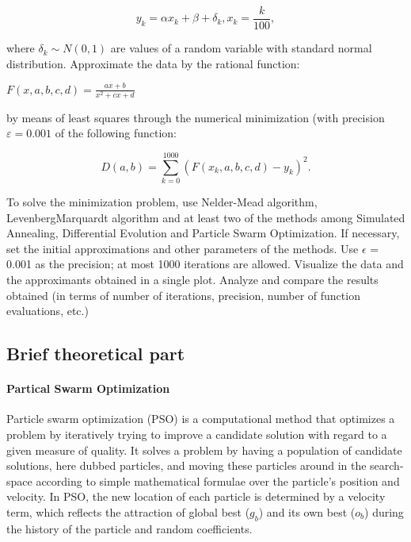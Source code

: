 \documentclass{article}
\begin{document}
\begin{equation}
    y_k = \alpha x_k + \beta + \delta_k, x_k = \frac{k}{100},
\end{equation}

where $\delta_k \sim N(0, 1)$ are values of a random variable with standard normal distribution.
Approximate the data by the rational function:

\begin{center}
    \item $F(x, a, b, c, d) = \frac{ax + b}{x^2 + cx + d}$
\end{center}

by means of least squares through the numerical minimization (with precision $\varepsilon = 0.001$ of the following function:

\begin{equation}
    D(a, b) = \sum^{1000}_{k=0}(F(x_k, a, b, c, d) - y_k)^2.
\end{equation}

To solve the minimization problem, use Nelder-Mead algorithm, LevenbergMarquardt algorithm and at least two of the methods among Simulated Annealing,
Differential Evolution and Particle Swarm Optimization. If necessary, set the initial
approximations and other parameters of the methods. Use $\epsilon$ = 0.001 as the
precision; at most 1000 iterations are allowed. Visualize the data and the
approximants obtained in a single plot. Analyze and compare the results obtained
(in terms of number of iterations, precision, number of function evaluations, etc.)
\subsection*{Brief theoretical part}

\paragraph{Partical Swarm Optimization}

Particle swarm optimization (PSO) is a computational method that optimizes a problem by iteratively trying to improve a candidate solution with regard to a given measure of quality. It solves a problem by having a population of candidate solutions, here dubbed particles, and moving these particles around in the search-space according to simple mathematical formulae over the particle's position and velocity. In PSO, the new location of each particle is determined by a velocity term, which reflects the attraction of global best ($g_b$) and its own best ($o_b$) during the history of the particle and random coefficients.
\end{document}
